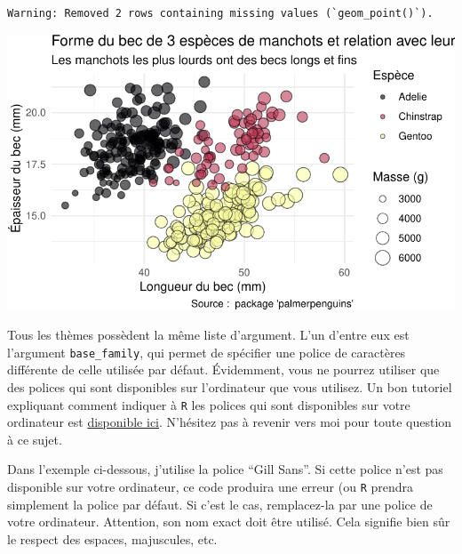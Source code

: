 \documentclass[
  a4paper,
  DIV=11,
  numbers=noendperiod,
  oneside]{scrreprt}
\begin{document}
\begin{verbatim}
Warning: Removed 2 rows containing missing values (`geom_point()`).
\end{verbatim}

\includegraphics{03-visualization_files/figure-pdf/unnamed-chunk-110-1.pdf}

Tous les thèmes possèdent la même liste d'argument. L'un d'entre eux est
l'argument \texttt{base\_family}, qui permet de spécifier une police de
caractères différente de celle utilisée par défaut. Évidemment, vous ne
pourrez utiliser que des polices qui sont disponibles sur l'ordinateur
que vous utilisez. Un bon tutoriel expliquant comment indiquer à
\texttt{R} les polices qui sont disponibles sur votre ordinateur est
\href{https://r-coder.com/custom-fonts-r/}{disponible ici}. N'hésitez
pas à revenir vers moi pour toute question à ce sujet.

Dans l'exemple ci-dessous, j'utilise la police ``Gill Sans''. Si cette
police n'est pas disponible sur votre ordinateur, ce code produira une
erreur (ou \texttt{R} prendra simplement la police par défaut. Si c'est
le cas, remplacez-la par une police de votre ordinateur. Attention, son
nom exact doit être utilisé. Cela signifie bien sûr le respect des
espaces, majuscules, etc.
\end{document}
